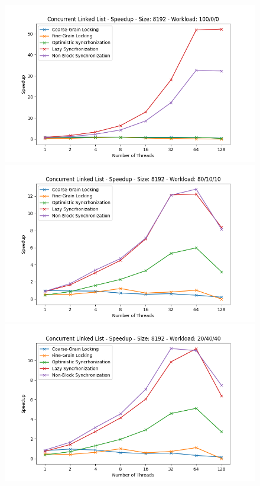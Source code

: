 \documentclass[../final_report.tex]{subfiles}
\begin{document}
\begin{figure}[H]
    \centering
        \includegraphics[scale=0.4]{outFiles/plots/concurrent_data_structs_all_speedup_8192_100_0_0.png}
        \includegraphics[scale=0.4]{outFiles/plots/concurrent_data_structs_all_speedup_8192_80_10_10.png}
        \includegraphics[scale=0.4]{outFiles/plots/concurrent_data_structs_all_speedup_8192_20_40_40.png}

\end{figure}
\end{document}
